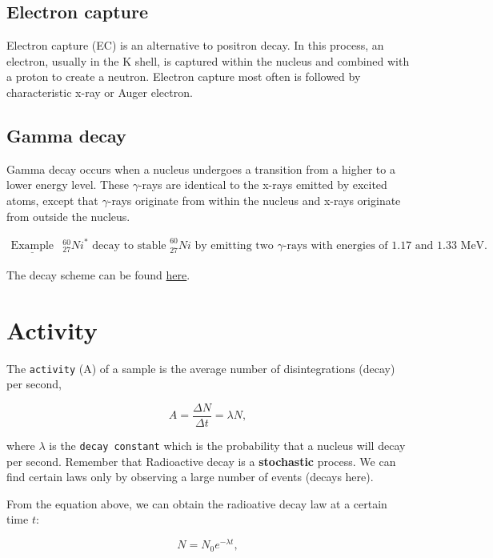 \documentclass[]{book}
\theoremstyle{definition}
\theoremstyle{definition}
\theoremstyle{definition}
\theoremstyle{remark}
\begin{document}
\subsection{Electron capture}\label{ec}

Electron capture (EC) is an alternative to positron decay. In this
process, an electron, usually in the K shell, is captured within the
nucleus and combined with a proton to create a neutron. Electron capture
most often is followed by characteristic x-ray or Auger electron.

\subsection{Gamma decay}\label{gamma}

Gamma decay occurs when a nucleus undergoes a transition from a higher
to a lower energy level. These \(\gamma\)-rays are identical to the
x-rays emitted by excited atoms, except that \(\gamma\)-rays originate
from within the nucleus and x-rays originate from outside the nucleus.

\[
\begin{matrix}
\underline{\text{Example}} & _{27}^{60}Ni^{*} \text{ decay to stable }_{27}^{60}Ni \text{ by emitting two } \gamma \text{-rays with energies of 1.17 and 1.33 MeV.}
\end{matrix}
\]

The decay scheme can be found
\href{http://atom.kaeri.re.kr:8080/gamrays.html}{here}.

\section{Activity}\label{activity}

The \texttt{activity} (A) of a sample is the average number of
disintegrations (decay) per second,

\begin{equation}
A = \frac{\Delta N}{\Delta t} = \lambda N,
\end{equation}

where \(\lambda\) is the \texttt{decay\ constant} which is the
probability that a nucleus will decay per second. Remember that
Radioactive decay is a \textbf{stochastic} process. We can find certain
laws only by observing a large number of events (decays here).

From the equation above, we can obtain the radioative decay law at a
certain time \(t\):

\begin{equation}
N = N_0 e^{-\lambda t},
\label{eq:decay1}
\end{equation}
\end{document}
